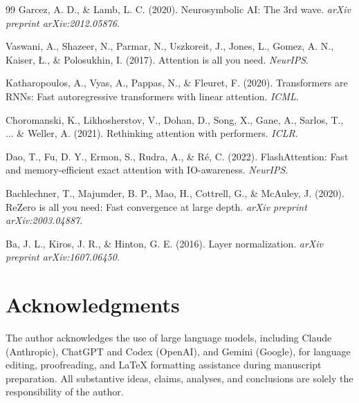 \documentclass[11pt,a4paper]{article}
\begin{document}
\begin{thebibliography}{99}
Garcez, A. D., \& Lamb, L. C. (2020).
Neurosymbolic AI: The 3rd wave.
\textit{arXiv preprint arXiv:2012.05876}.

Vaswani, A., Shazeer, N., Parmar, N., Uszkoreit, J., Jones, L., Gomez, A. N., Kaiser, {\L}., \& Polosukhin, I. (2017).
Attention is all you need.
\textit{NeurIPS}.

Katharopoulos, A., Vyas, A., Pappas, N., \& Fleuret, F. (2020).
Transformers are RNNs: Fast autoregressive transformers with linear attention.
\textit{ICML}.

Choromanski, K., Likhosherstov, V., Dohan, D., Song, X., Gane, A., Sarlos, T., ... \& Weller, A. (2021).
Rethinking attention with performers.
\textit{ICLR}.

Dao, T., Fu, D. Y., Ermon, S., Rudra, A., \& Ré, C. (2022).
FlashAttention: Fast and memory-efficient exact attention with IO-awareness.
\textit{NeurIPS}.

Bachlechner, T., Majumder, B. P., Mao, H., Cottrell, G., \& McAuley, J. (2020).
ReZero is all you need: Fast convergence at large depth.
\textit{arXiv preprint arXiv:2003.04887}.

Ba, J. L., Kiros, J. R., \& Hinton, G. E. (2016).
Layer normalization.
\textit{arXiv preprint arXiv:1607.06450}.
\end{thebibliography}

\section*{Acknowledgments}
The author acknowledges the use of large language models, including Claude (Anthropic), ChatGPT and Codex (OpenAI), and Gemini (Google), for language editing, proofreading, and LaTeX formatting assistance during manuscript preparation. All substantive ideas, claims, analyses, and conclusions are solely the responsibility of the author.
\end{document}
